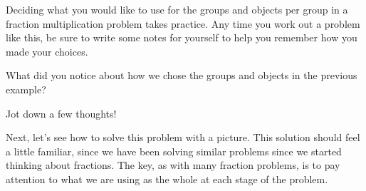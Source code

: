 \documentclass{ximera}
\begin{document}
\begin{example}
\begin{image}
\end{image}
\end{example}

Deciding what you would like to use for the groups and objects per group in a fraction multiplication problem takes practice. Any time you work out a problem like this, be sure to write some notes for yourself to help you remember how you made your choices. 

\begin{question}
What did you notice about how we chose the groups and objects in the previous example?
\begin{freeResponse}
Jot down a few thoughts!
\end{freeResponse}
\end{question}

Next, let's see how to solve this problem with a picture. This solution should feel a little familiar, since we have been solving similar problems since we started thinking about fractions. The key, as with many fraction problems, is to pay attention to what we are using as the whole at each stage of the problem.
\end{document}
